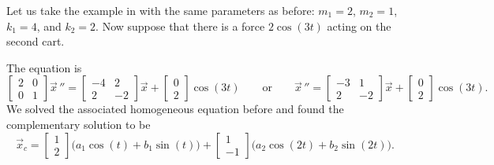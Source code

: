 \documentclass[12pt]{book}
\begin{document}
\begin{example}
Let us take the example in  with
the same parameters as before:
$m_1 = 2$, $m_2 = 1$, $k_1 = 4$, and $k_2 = 2$.  Now suppose that
there is a force $2 \cos (3t)$ acting on the second cart.

The equation is
\begin{equation*}
\begin{bmatrix}
2 & 0 \\
0 & 1
\end{bmatrix}
{\vec{x}\,}'' =
\begin{bmatrix}
-4 & 2 \\
2 & -2
\end{bmatrix}
\vec{x} 
+ 
\begin{bmatrix}
0 \\ 2
\end{bmatrix}
\cos (3 t) \qquad \text{or} \qquad
{\vec{x}\,}'' =
\begin{bmatrix}
-3 & 1 \\
2 & -2
\end{bmatrix}
\vec{x} 
+ 
\begin{bmatrix}
0 \\ 2
\end{bmatrix}
\cos (3 t) .
\end{equation*}
We solved the associated homogeneous equation before and found the
complementary solution to be
\begin{equation*}
\vec{x}_c =
\begin{bmatrix} 1 \\ 2 \end{bmatrix}
\bigl( a_1 \cos (t) + b_1 \sin (t) \bigr)
+
\begin{bmatrix} 1 \\ -1 \end{bmatrix}
\bigl( a_2 \cos (2t) + b_2 \sin (2t) \bigr) .
\end{equation*}


\end{example}
\end{document}
